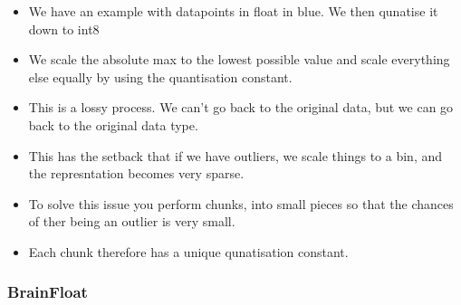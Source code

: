 \documentclass[11pt]{article}
\begin{document}
\begin{minipage}[l]{.5\linewidth}
    \begin{figure}[H]
        \centering
    \end{figure}    
\end{minipage}\hfill
\begin{minipage}[r]{.48\linewidth}
    \begin{itemize}
        \item We have an example with datapoints in float in blue. We then qunatise it down to int8
        \item We scale the absolute max to the lowest possible value and scale everything else equally by using the quantisation constant. 
        \item This is a lossy process. We can't go back to the original data, but we can go back to the original data type.
        \item This has the setback that if we have outliers, we scale things to a bin, and the represntation becomes very sparse.
        \item To solve this issue you perform chunks, into small pieces so that the chances of ther being an outlier is very small. 
        \item Each chunk therefore has a unique qunatisation constant. 
    \end{itemize}
\end{minipage}

\subsubsection{BrainFloat}
\end{document}
